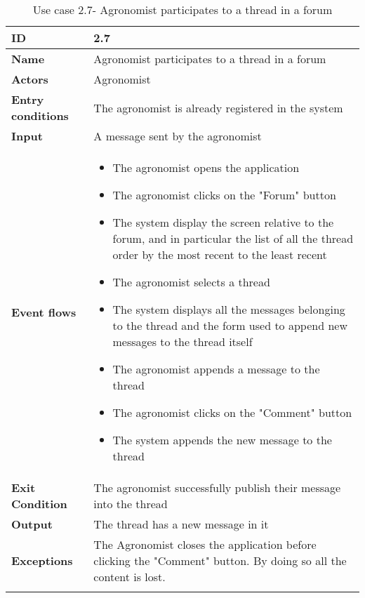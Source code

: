 \begin{longtable}[H]{ | l | p{10cm} | }
\hline
{\cellcolor[rgb]{0.753,0.753,0.753}}\textbf{ID}  & 2.7 \\ \hline
{\cellcolor[rgb]{0.753,0.753,0.753}}\textbf{Name} & Agronomist participates to a thread in a forum \\ \hline
{\cellcolor[rgb]{0.753,0.753,0.753}}\textbf{Actors} & Agronomist \\ \hline
{\cellcolor[rgb]{0.753,0.753,0.753}}\textbf{Entry conditions} & The agronomist is already registered in the system \\ \hline
{\cellcolor[rgb]{0.753,0.753,0.753}}\textbf{Input} & A message sent by the agronomist\\ \hline
{\cellcolor[rgb]{0.753,0.753,0.753}}\textbf{Event flows} &
\begin{itemize}
    \item The agronomist opens the application
    \item The agronomist clicks on the "Forum" button
    \item The system display the screen relative to the forum, and in particular the list of all the thread order by the most recent to the least recent 
    \item The agronomist selects a thread
    \item The system displays all the messages belonging to the thread and the form used to append new messages to the thread itself
    \item The agronomist appends a message to the thread 
    \item The agronomist clicks on the "Comment" button
    \item The system appends the new message to the thread
\end{itemize}
\\ \hline
{\cellcolor[rgb]{0.753,0.753,0.753}}\textbf{Exit Condition} & The agronomist successfully publish their message into the thread\\ \hline
{\cellcolor[rgb]{0.753,0.753,0.753}}\textbf{Output} & 
The thread has a new message in it
\\ \hline
{\cellcolor[rgb]{0.753,0.753,0.753}}\textbf{Exceptions} & The Agronomist closes the application before clicking the "Comment" button. By doing so all the content is lost.
\\ \hline
\caption{Use case 2.7- Agronomist participates to a thread in a forum}
\\
\end{longtable}